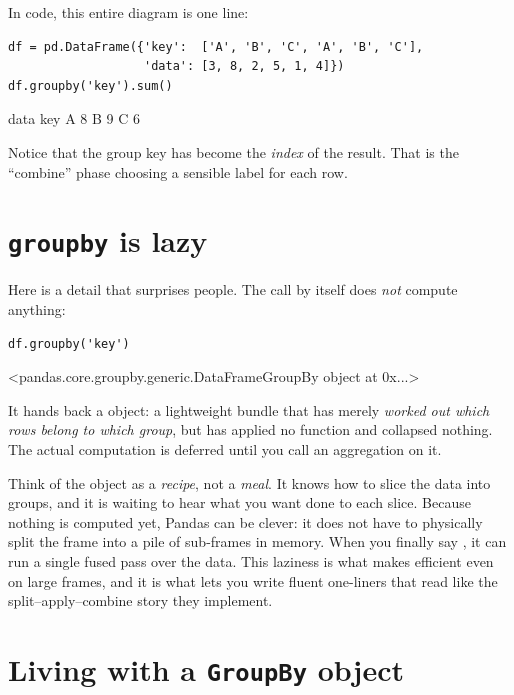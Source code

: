 \documentclass[11pt]{article}
\begin{document}
In code, this entire diagram is one line:

\begin{lstlisting}
df = pd.DataFrame({'key':  ['A', 'B', 'C', 'A', 'B', 'C'],
                   'data': [3, 8, 2, 5, 1, 4]})
df.groupby('key').sum()
\end{lstlisting}

\begin{outblock}
     data
key
A       8
B       9
C       6
\end{outblock}

Notice that the group key has become the \emph{index} of the result. That is the ``combine'' phase choosing a sensible label for each row.

\section{\texttt{groupby} is lazy}

Here is a detail that surprises people. The call  by itself does \emph{not} compute anything:

\begin{lstlisting}
df.groupby('key')
\end{lstlisting}

\begin{outblock}
<pandas.core.groupby.generic.DataFrameGroupBy object at 0x...>
\end{outblock}

It hands back a  object: a lightweight bundle that has merely \emph{worked out which rows belong to which group}, but has applied no function and collapsed nothing. The actual computation is deferred until you call an aggregation on it.

\begin{intuition}
Think of the  object as a \emph{recipe}, not a \emph{meal}. It knows how to slice the data into groups, and it is waiting to hear what you want done to each slice. Because nothing is computed yet, Pandas can be clever: it does not have to physically split the frame into a pile of sub-frames in memory. When you finally say , it can run a single fused pass over the data. This laziness is what makes  efficient even on large frames, and it is what lets you write fluent one-liners that read like the split--apply--combine story they implement.
\end{intuition}

\section{Living with a \texttt{GroupBy} object}
\end{document}
